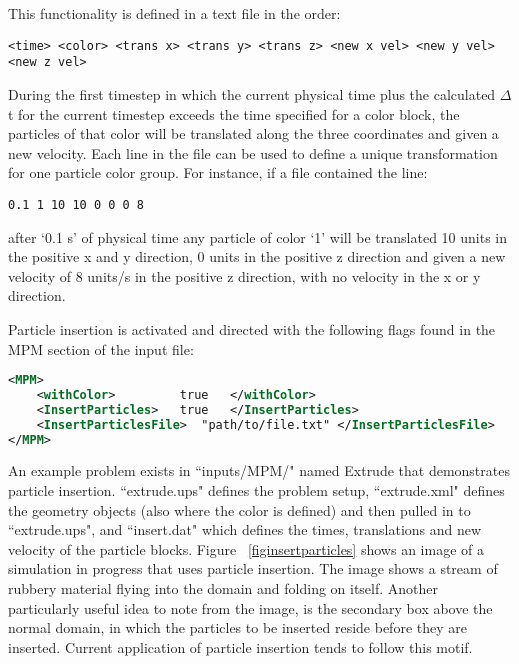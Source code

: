 This functionality is defined in a text file in the order: 

\begin{lstlisting}[backgroundcolor=\color{background}]
<time> <color> <trans x> <trans y> <trans z> <new x vel> <new y vel> <new z vel>
\end{lstlisting}  

During the first timestep in which the current physical time plus the calculated 
$\Delta$t for the current timestep exceeds the time specified for a color block, the 
particles of that color will be translated along the three coordinates and given 
a new velocity.  Each line in the file can be used to define a unique transformation
for one particle color group.  For instance, if a file contained the line:

\begin{lstlisting}[backgroundcolor=\color{background}]
0.1 1 10 10 0 0 0 8 
\end{lstlisting}

\noindent after `0.1 s' of physical time any particle of color `1' will be translated 10 
units in the positive x and y direction, 0 units in the positive z direction 
and given a new velocity of 8 units/s in the positive z direction, with no 
velocity in the x or y direction.

Particle insertion is activated and directed with the following flags found in the 
MPM section of the input file:
\begin{lstlisting}[language=XML]
<MPM>
    <withColor>         true   </withColor>
    <InsertParticles>   true   </InsertParticles>
    <InsertParticlesFile>  "path/to/file.txt" </InsertParticlesFile>
</MPM>
\end{lstlisting}

An example problem exists in ``inputs/MPM/" named Extrude that demonstrates 
particle insertion.  ``extrude.ups" defines the problem setup, ``extrude.xml" defines 
the geometry objects (also where the color is defined) and then pulled in to 
``extrude.ups", and ``insert.dat" which defines the times, translations and new 
velocity of the particle blocks.  Figure ~\ref{figinsertparticles} shows an image 
of a simulation in progress that uses particle insertion.  The image shows a stream 
of rubbery material flying into the domain and folding on itself.  Another particularly 
useful idea to note from the image, is the secondary box above the normal domain, in which 
the particles to be inserted reside before they are inserted.  Current application 
of particle insertion tends to follow this motif.


